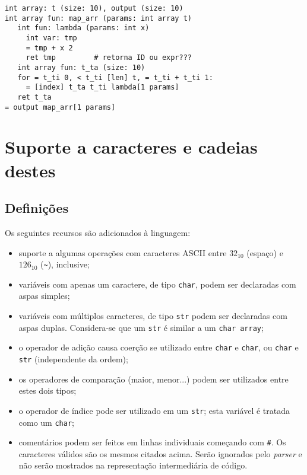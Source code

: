 \documentclass{article}
\newenvironment{smallitem}{
    \vspace{-1mm}
    \begin{itemize}
    \setlength{\parskip}{0pt}
    \setlength{\itemsep}{2pt}
}{
    \vspace{-2mm}
    \end{itemize}
}
\begin{document}
\begin{verbatim}
int array: t (size: 10), output (size: 10)
int array fun: map_arr (params: int array t)
   int fun: lambda (params: int x)
     int var: tmp
     = tmp + x 2
     ret tmp         # retorna ID ou expr???
   int array fun: t_ta (size: 10)
   for = t_ti 0, < t_ti [len] t, = t_ti + t_ti 1:
     = [index] t_ta t_ti lambda[1 params]
   ret t_ta
= output map_arr[1 params]

\end{verbatim}



\section{Suporte a caracteres e cadeias destes}

\subsection{Definições}

Os seguintes recursos são adicionados à linguagem:

\begin{smallitem}
    \item suporte a algumas operações com caracteres ASCII entre $32_{10}$
        (espaço) e $126_{10}$ (\texttt{\~}), inclusive;
    \item variáveis com apenas um caractere, de tipo \texttt{char}, podem ser
        declaradas com aspas simples;
    \item variáveis com múltiplos caracteres, de tipo \texttt{str} podem ser
        declaradas com aspas duplas. Considera-se que um \texttt{str} é
        similar a um \texttt{char array};
    \item o operador de adição causa coerção se utilizado entre \texttt{char} e
        \texttt{char}, ou \texttt{char} e \texttt{str} (independente da ordem);
    \item os operadores de comparação (maior, menor...) podem ser utilizados
        entre estes dois tipos;
    \item o operador de índice pode ser utilizado em um \texttt{str}; esta
        variável é tratada como um \texttt{char};
    \item comentários podem ser feitos em linhas individuais começando com
        \texttt{\#}. Os caracteres válidos são os mesmos citados acima.
        Serão ignorados pelo \emph{parser} e não serão mostrados na
        representação intermediária de código.
\end{smallitem}
\end{document}
